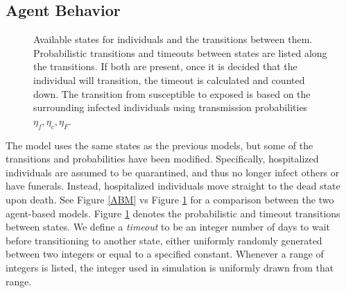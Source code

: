 \subsection{Agent Behavior}
\begin{figure}[h!t]
\begin{center}
\end{center}
\caption{Available states for individuals and the transitions between them. Probabilistic transitions and timeouts between states are listed along the transitions. If both are present, once it is decided that the individual will transition, the timeout is calculated and counted down. The transition from susceptible to exposed is based on the surrounding infected individuals using transmission probabilities $\eta_f,\eta_c,\eta_F$.}
\label{fig:sabm-states}
\end{figure}

The model uses the same states as the previous models, but some of the transitions and probabilities have been modified. Specifically, hospitalized individuals are assumed to be quarantined, and thus no longer infect others or have funerals. Instead, hospitalized individuals move straight to the dead state upon death. See Figure \ref{ABM} vs Figure \ref{fig:sabm-states} for a comparison between the two agent-based models. Figure \ref{fig:sabm-states} denotes the probabilistic and timeout transitions between states. We define a \emph{timeout} to be an integer number of days to wait before transitioning to another state, either uniformly randomly generated between two integers or equal to a specified constant. Whenever a range of integers is listed, the integer used in simulation is uniformly drawn from that range.

